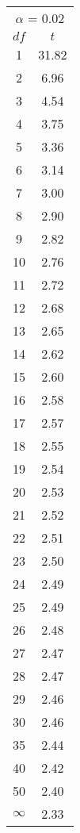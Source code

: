 \begin{tabular}{|c|c|}\hline
 \multicolumn{2}{|c|}{$\alpha$ = 0.02}\\
$df$ & $t$ \\ \hline
1 & 31.82\\
2 & 6.96\\
3 & 4.54\\
4 & 3.75\\
5 & 3.36\\
6 & 3.14\\
7 & 3.00\\
8 & 2.90\\
9 & 2.82\\
10 & 2.76\\
11 & 2.72\\
12 & 2.68\\
13 & 2.65\\
14 & 2.62\\
15 & 2.60\\
16 & 2.58\\
17 & 2.57\\
18 & 2.55\\
19 & 2.54\\
20 & 2.53\\
21 & 2.52\\
22 & 2.51\\
23 & 2.50\\
24 & 2.49\\
25 & 2.49\\
26 & 2.48\\
27 & 2.47\\
28 & 2.47\\
29 & 2.46\\
30 & 2.46\\
35 & 2.44\\
40 & 2.42\\
50 & 2.40\\
$\infty$ & 2.33\\
\hline \end{tabular}

